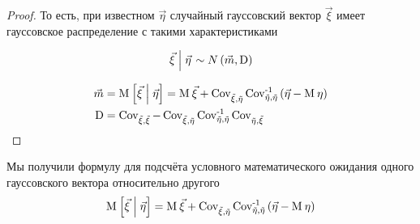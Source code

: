 \begin{proof}
    То есть, при известном $\vec{\eta}$ случайный гауссовский вектор
    $\vec{\xi}$ имеет гауссовское распределение с такими характеристиками

    $$\left. \vec{\xi} \mcond \vec{\eta} \right. \sim N\left( \vec{m},
        \operatorname{D} \right)$$
    
    \begin{align*}
    \vec{m}
        &= \Mean{\vec{\xi} \mcond \vec{\eta}}
        = \mean{\vec{\xi}} + \Cov{\vec{\xi}}{\vec{\eta}}
            \dCov[-1]{\vec{\eta}}\left( \vec{\eta} - \mean{\eta} \right) \\
    \operatorname{D}
        &= \dCov{\vec{\xi}} - \Cov{\vec{\xi}}{\vec{\eta}} \dCov[-1]{\vec{\eta}}
            \Cov{\vec{\eta}}{\vec{\xi}}
    \end{align*}
\end{proof}

\begin{remark}\label{remark:gaussianVector:conditionalExpectation}
    Мы получили формулу для подсчёта условного математического ожидания одного
    гауссовского вектора относительно другого
    \begin{align*}
    \Mean{\vec{\xi} \mcond \vec{\eta}}
    = \mean{\vec{\xi}} + \Cov{\vec{\xi}}{\vec{\eta}}
            \dCov[-1]{\vec{\eta}}\left( \vec{\eta} - \mean{\eta} \right)
    \end{align*}
\end{remark}
